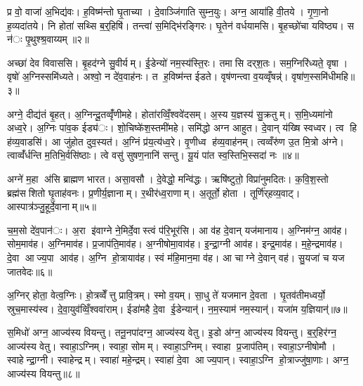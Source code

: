 
प्र वो॒ वाजा॑ अ॒भिद्य॑वः। ह॒विष्म॑न्तो घृ॒ताच्या। दे॒वाञ्जि॑गाति सुम्न॒युः। अग्न॒ आया॑हि वी॒तये। गृ॒णा॒नो ह॒व्यदा॑तये। नि होता॑ सथ्सि ब॒र्॒हिषि॑। तन्त्वा॑ स॒मिद्भि॑रङ्गिरः। घृ॒तेन॑ वर्धयामसि। बृ॒हच्छो॑चा यविष्ठ्य। स न॑ः पृ॒थुश्श्र॒वाय्यम्॥२॥

अच्छा॑ देव विवाससि। बृ॒हद॑ग्ने सु॒वीर्यम्। ई॒डेन्यो॑ नम॒स्य॑स्ति॒रः। तमासि दर्‌श॒तः। सम॒ग्निरि॑ध्यते॒ वृषा। वृषो॑ अ॒ग्निस्समि॑ध्यते। अश्वो॒ न दे॑व॒वाह॑नः। त ह॒विष्म॑न्त ईडते। वृष॑णन्त्वा व॒यव्वृँषन्न्॑। वृषा॑ण॒स्समि॑धीमहि॥३॥

अग्ने॒ दीद्य॑तं बृ॒हत्। अ॒ग्निन्दू॒तव्वृँ॑णीमहे। होता॑रव्विँ॒श्ववे॑दसम्। अ॒स्य य॒ज्ञस्य॑ सु॒क्रतुम्। स॒मि॒ध्यमा॑नो अध्व॒रे। अ॒ग्निः पा॑व॒क ईड्य॑ः। शो॒चिष्के॑श॒स्तमी॑महे। समि॑द्धो अग्न आहुत। दे॒वान् य॑ख्षि स्वध्वर। त्व हि ह॑व्य॒वाडसि॑। आ जु॑होत दुव॒स्यत॑। अ॒ग्निं प्र॑य॒त्य॑ध्व॒रे। वृ॒णीध्व ह॑व्य॒वाह॑नम्। त्वव्वँरु॑ण उ॒त मि॒त्रो अ॑ग्ने। त्वाव्वँ॑र्धन्ति म॒तिभि॒र्वसि॑ष्ठाः। त्वे वसु॑ सुषण॒नानि॑ सन्तु। यू॒यं पा॑त स्व॒स्तिभि॒स्सदा॑ नः ॥४॥


अग्ने॑ म॒हा अ॑सि ब्राह्मण भारत। असा॒वसौ। दे॒वेद्धो॒ मन्वि॑द्धः। ऋषि॑ष्टुतो॒ विप्रा॑नुमदितः। क॒वि॒श॒स्तो ब्रह्म॑सशितो घृ॒ताह॑वनः। प्र॒णीर्य॒ज्ञानाम्। र॒थीर॑ध्व॒राणाम्। अ॒तूर्तो॒ होता। तूर्णि॑र्‌हव्य॒वाट्। आस्पात्र॑ञ्जु॒हूर्दे॒वानाम्॥५॥

च॒म॒सो दे॑व॒पान॑ः। अ॒रा इ॑वाग्ने ने॒मिर्दे॒वास्त्वं प॑रि॒भूर॑सि। आ व॑ह दे॒वान् यज॑मानाय। अ॒ग्निम॑ग्न॒ आव॑ह। सोम॒माव॑ह। अ॒ग्निमाव॑ह। प्र॒जाप॑ति॒माव॑ह। अ॒ग्नीषोमा॒वाव॑ह। इ॒न्द्रा॒ग्नी आव॑ह। इन्द्र॒माव॑ह। म॒हे॒न्द्रमाव॑ह। दे॒वा आज्य॒पा आव॑ह। अ॒ग्नि हो॒त्रायाव॑ह। स्वं म॑हि॒मान॒मा व॑ह। आ चाग्ने दे॒वान् वह॑। सु॒यजा॑ च यज जातवेदः॥६॥


अ॒ग्निर् होता॒ वेत्व॒ग्निः। हो॒त्रव्वेँत्तु प्रावि॒त्रम्। स्मो व॒यम्। सा॒धु ते॑ यजमान दे॒वता। घृ॒तव॑तीमध्वर्यो॒ स्रुच॒मास्य॑स्व। दे॒वा॒युव॑व्विँ॒श्ववा॑राम्। ईडा॑महै दे॒वा ई॒डेन्यान्॑। न॒म॒स्याम॑ नम॒स्यान्॑। यजा॑म य॒ज्ञियान्॑॥७॥


स॒मिधो॑ अग्न॒ आज्य॑स्य वियन्तु। तनू॒नपा॑दग्न॒ आज्य॑स्य वेतु। इ॒डो अ॑ग्न॒ आज्य॑स्य वियन्तु। ब॒र्॒हिर॑ग्न॒ आज्य॑स्य वेतु। स्वाहा॒ऽग्निम्। स्वाहा॒ सोमम्। स्वाहा॒ऽग्निम्। स्वाहा प्र॒जाप॑तिम्। स्वाहा॒ऽग्नीषोमौ। स्वाहेन्द्रा॒ग्नी। स्वाहेन्द्रम्। स्वाहा॑ महे॒न्द्रम्। स्वाहा॑ दे॒वा आज्य॒पान्। स्वाहा॒ऽग्नि हो॒त्राज्जु॑षा॒णाः। अग्न॒ आज्य॑स्य वियन्तु॥८॥

